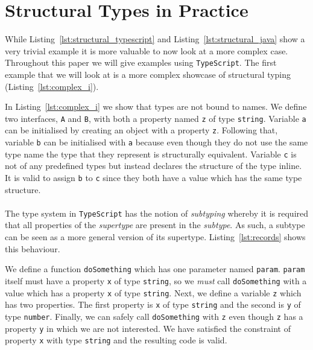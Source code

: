 \documentclass{article}
\newcommand{\ttt}[1]{\texttt{#1}}
\begin{document}
\section*{Structural Types in Practice}
While Listing~\ref{lst:structural_typescript} and Listing~\ref{lst:structural_java} show a very trivial example it is more valuable to now look at a more complex case.
Throughout this paper we will give examples using \ttt{TypeScript}.
The first example that we will look at is a more complex showcase of structural typing (Listing~\ref{lst:complex_i}).
\noindent
\begin{center}
    \begin{minipage}{.60\textwidth}
    
    \end{minipage}
\end{center}
In Listing~\ref{lst:complex_i} we show that types are not bound to names.
We define two interfaces, \ttt{A} and \ttt{B}, with both a property named \ttt{z} of type \ttt{string}.
Variable \ttt{a} can be initialised by creating an object with a property \ttt{z}.
Following that, variable \ttt{b} can be initialised with \ttt{a} because even though they do not use the same type name the type that they represent is structurally equivalent.
Variable \ttt{c} is not of any predefined types but instead declares the structure of the type inline.
It is valid to assign \ttt{b} to \ttt{c} since they both have a value which has the same type structure.
\\\\
The type system in \ttt{TypeScript} has the notion of \textit{subtyping} whereby it is required that all properties of the \textit{supertype} are present in the \textit{subtype}.
As such, a subtype can be seen as a more general version of its supertype.
Listing~\ref{lst:records} shows this behaviour.
\begin{center}
    \begin{minipage}{.75\textwidth}
    
    \end{minipage}
\end{center}
We define a function \ttt{doSomething} which has one parameter named \ttt{param}.
\ttt{param} itself must have a property \ttt{x} of type \ttt{string}, so we \textit{must} call \ttt{doSomething} with a value which has a property \ttt{x} of type \ttt{string}.
Next, we define a variable \ttt{z} which has two properties.
The first property is \ttt{x} of type \ttt{string} and the second is \ttt{y} of type \ttt{number}.
Finally, we can safely call \ttt{doSomething} with \ttt{z} even though \ttt{z} has a property \ttt{y} in which we are not interested.
We have satisfied the constraint of property \ttt{x} with type \ttt{string} and the resulting code is valid.
\end{document}
